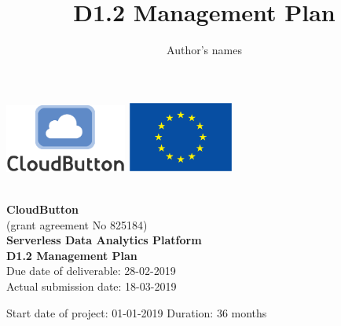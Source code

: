 \documentclass[a4paper,11pt]{article}
\title{D1.2 Management Plan}
\author{Author's names}
\begin{document}
\clearpage\setcounter{page}{1}\pagestyle{empty}



\begin{center}
	\begin{center}
		\includegraphics[width=4cm]{figures/cloudbutton_logo.eps}
		\hfill
		\includegraphics[width=3.5cm]{figures/eu_flag_eps.eps}
	\end{center}
\vspace*{1.3cm}
 \\
\vspace*{0.6cm}
\noindent \Huge \textbf{CloudButton} \\
\vspace*{0.3cm}
\noindent \normalsize (grant agreement No 825184) \\
\vspace*{0.8cm}
\noindent \LARGE \textbf{Serverless Data Analytics Platform}\\
\vspace*{4.0cm}
\noindent \LARGE \textbf{D1.2 Management Plan} \\
\vspace*{5.0cm}
\noindent \large Due date of deliverable: 28-02-2019 \\
\noindent \large Actual submission date: 18-03-2019\\
\vspace*{3.0cm}

Start date of project: 01-01-2019
\hfill
Duration: 36 months\\

\end{center}




\newpage\pagestyle{empty}
\end{document}
